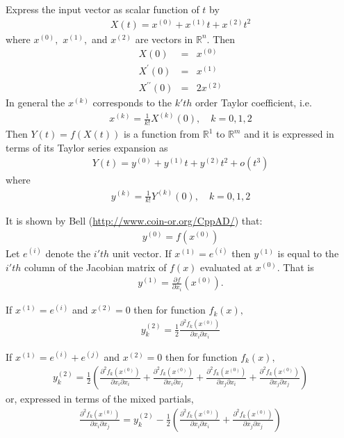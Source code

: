 \documentclass[11pt]{article}
\newcommand{\D}[2]{ \frac{\partial #1}{\partial #2} }
\newcommand{\DD}[3]{ \frac{\partial^2 #1}{\partial #2 \partial #3} }
\renewcommand{\_}{{\char"5F}}
\renewcommand{\{}{{\char"7B}}
\renewcommand{\}}{{\char"7D}}
\renewcommand{\^}{{\char"0D}}
\renewcommand{\'}{{\char"0D}}
\begin{document}
Express the input vector as scalar function of $t$ by
\begin{eqnarray}
X(t) = x^{(0)} +  x^{(1)} t +  x^{(2)} t^{2}
\end{eqnarray}
where $ x^{(0)},$ $x^{(1)},$ and $x^{(2)}$ are vectors in $ \mathbb{R}^{n}.$ Then
\begin{eqnarray*}
X(0) &=& x^{(0)} \\
X^{\prime}(0) &=& x^{(1)} \\
X^{\prime \prime }(0) &=& 2 x^{(2)}
\end{eqnarray*}
In general the $x^{(k)}$ corresponds to the $k'th$ order Taylor coefficient, i.e.
\begin{eqnarray}
x^{(k)} = \frac{1}{k!}X^{(k)}(0), \quad k = 0, 1, 2  \label{eq:xTaylorCoeff}
\end{eqnarray}
Then $Y(t) = f(X(t))$ is a function from $ \mathbb{R}^{1}$ to $ \mathbb{R}^{m}$ and it is expressed in terms of its Taylor series expansion as
\begin{eqnarray}
Y(t)  = y^{(0)} +  y^{(1)} t +  y^{(2)} t^{2} + o(t^{3})
\end{eqnarray}
where
\begin{eqnarray}
y^{(k)} = \frac{1}{k!} Y^{(k)}(0), \quad k = 0, 1, 2  \label{eq:yTaylorCoeff}
\end{eqnarray}



It is shown by Bell (\url{http://www.coin-or.org/CppAD/}) that:
\begin{eqnarray}
y^{(0)} = f(x^{(0)}) \label{eq:forward0Result}
\end{eqnarray}
Let $e^{(i)}$ denote the $i'th$ unit vector.  If $x^{(1)} = e^{(i)}$ then $y^{(1)}$ is equal to the $i'th$ column of the Jacobian matrix of $f(x)$ evaluated at $x^{(0)}.$ That is
\begin{eqnarray}
y^{(1)} = \D{f}{x_{i}}(x^{(0)}).  \label{eq:forward1Result}
\end{eqnarray}

If $x^{(1)} = e^{(i)}$ and $x^{(2)} = 0$ then for function $f_{k}(x),$
\begin{eqnarray}
y^{(2)}_{k} =  \frac{1}{2} \DD{f_{k}(x^{(0)})}{x_{i}}{x_{i}}  \label{eq:forward2Resulta}
\end{eqnarray}

If $x^{(1)} = e^{(i)} + e^{(j)}$ and $x^{(2)} = 0$ then for function $f_{k}(x),$
\begin{eqnarray}
y^{(2)}_{k} =  \frac{1}{2} \left( \DD{f_{k}(x^{(0)})}{x_{i}}{x_{i}}  +   \DD{f_{k}(x^{(0)})}{x_{i}}{x_{j}} +  \DD{f_{k}(x^{(0)})}{x_{j}}{x_{i}} +  \DD{f_{k}(x^{(0)})}{x_{j}}{x_{j}}  \right) \label{eq:forward2Resultb}
\end{eqnarray}
or, expressed in terms of the mixed partials,
\begin{eqnarray}
  \DD{f_{k}(x^{(0)})}{x_{i}}{x_{j}}  = y_{k}^{(2)}  -  \frac{1}{2} \left( \DD{f_{k}(x^{(0)})}{x_{i}}{x_{i}}  +  \DD{f_{k}(x^{(0)})}{x_{j}}{x_{j}}  \right) \label{eq:forward2Resultc}
\end{eqnarray}
\end{document}

